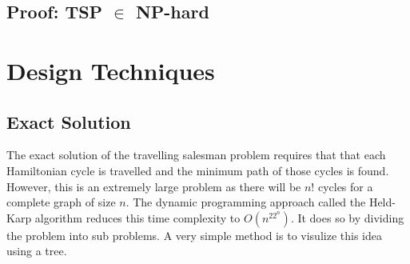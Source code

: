 \documentclass[11pt]{article}
\begin{document}
\subsection{Proof: TSP $\in$ NP-hard}
\section{Design Techniques}
	\subsection{Exact Solution}
	The exact solution of the travelling salesman problem requires that that each Hamiltonian cycle is travelled and the minimum path of those cycles is found. However, this is an extremely large problem as there will be $n!$ cycles for a complete graph of size $n$. The dynamic programming approach called the Held-Karp algorithm reduces this time complexity to $O(n^22^n)$. It does so by dividing the problem into sub problems.  A very simple method is to visulize this idea using a tree. \paragraph{}
\end{document}
